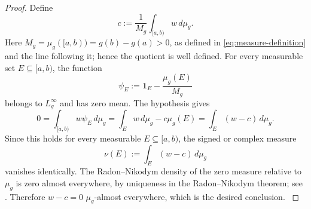 \documentclass[preprint,12pt]{elsarticle}
\newenvironment{revision}{\begingroup\color{red}}{\endgroup}
\newenvironment{revision}{}{}
\theoremstyle{definition}
\theoremstyle{remark}
\newcommand{\mug}{\mu_g}
\newcommand{\ind}{\mathbf 1}
\begin{document}
\begin{proof}
Define
\[
 c:=\frac1{M_g}\int_{[a,b)}w\,d\mug.
\]
\begin{revision}
Here \(M_g=\mu_g([a,b))=g(b)-g(a)>0\), as defined in
\eqref{eq:measure-definition} and the line following it; hence the quotient is
well defined.
\end{revision}
For every measurable set $E\subseteq [a,b)$, the function
\[
 \psi_E:=\ind_E-\frac{\mug(E)}{M_g}
\]
belongs to $L_g^\infty$ and has zero mean. The hypothesis gives
\[
 0=\int_{[a,b)} w\psi_E\,d\mug
 =\int_Ew\,d\mug-c\mug(E)
 =\int_E(w-c)\,d\mug.
\]
\begin{revision}
Since this holds for every measurable \(E\subseteq[a,b)\), the signed or complex
measure
\[
 \nu(E):=\int_E(w-c)\,d\mu_g
\]
vanishes identically.  The Radon--Nikodym density of the zero measure relative to
\(\mu_g\) is zero almost everywhere, by uniqueness in the Radon--Nikodym
theorem; see \cite{Bartle1995}.  Therefore \(w-c=0\)
\(\mu_g\)-almost everywhere, which is the desired conclusion.
\end{revision}
\end{proof}
\end{document}
